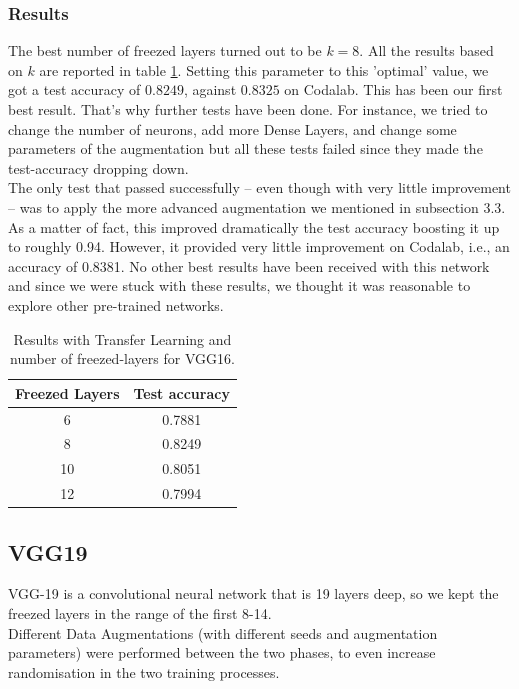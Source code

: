 \documentclass[10pt]{article}
\begin{document}
\subsubsection{Results}
The best number of freezed layers turned out to be $k=8$. All the results based on $k$ are reported in table \ref{vgg16_results}. Setting this parameter to this 'optimal' value, we got a test accuracy of $0.8249$, against $0.8325$ on Codalab. This has been our first best result. That's why further tests have been done. For instance, we tried to change the number of neurons, add more Dense Layers, and change some parameters of the augmentation but all these tests failed since they made the test-accuracy dropping down.\\[0.1cm]
The only test that passed successfully -- even though with very little improvement -- was to apply the more advanced augmentation we mentioned in subsection 3.3. As a matter of fact, this improved dramatically the test accuracy boosting it up to roughly 0.94. However, it provided very little improvement on Codalab, i.e., an accuracy of 0.8381. No other best results have been received with this network and since we were stuck with these results, we thought it was reasonable to explore other pre-trained networks.
\begin{table}[ht]
\centering
\small
\begin{tabular}{|c|c|}

\hline \bf Freezed Layers & \bf Test accuracy \\ \hline
6 & 0.7881 \\
8 & 0.8249 \\
10 & 0.8051 \\
12 & 0.7994 \\

\hline
\end{tabular}
\caption{Results with Transfer Learning and number of freezed-layers for VGG16.}
\label{vgg16_results}
\end{table}
\subsection{VGG19}
VGG-19 is a convolutional neural network that is 19 layers deep, so we kept the freezed layers in the range of the first 8-14.\\
Different Data Augmentations (with different seeds and augmentation parameters) were performed between the two phases,
to even increase randomisation in the two training processes.
\end{document}
